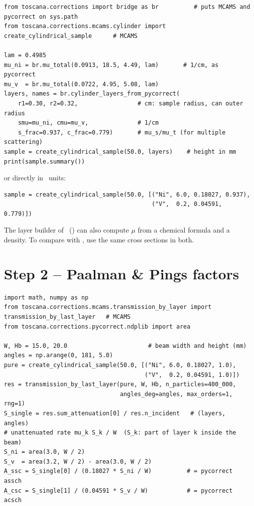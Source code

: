 \documentclass[11pt,a4paper]{report}
\begin{document}
\begin{lstlisting}
from toscana.corrections import bridge as br          # puts MCAMS and pycorrect on sys.path
from toscana.corrections.mcams.cylinder import create_cylindrical_sample      # MCAMS

lam = 0.4985
mu_ni = br.mu_total(0.0913, 18.5, 4.49, lam)       # 1/cm, as pycorrect
mu_v  = br.mu_total(0.0722, 4.95, 5.08, lam)
layers, names = br.cylinder_layers_from_pycorrect(
    r1=0.30, r2=0.32,                 # cm: sample radius, can outer radius
    smu=mu_ni, cmu=mu_v,              # 1/cm
    s_frac=0.937, c_frac=0.779)       # mu_s/mu_t (for multiple scattering)
sample = create_cylindrical_sample(50.0, layers)    # height in mm
print(sample.summary())
\end{lstlisting}
or directly in \mcams\ units:
\begin{lstlisting}
sample = create_cylindrical_sample(50.0, [("Ni", 6.0, 0.18027, 0.937),
                                          ("V",  0.2, 0.04591, 0.779)])
\end{lstlisting}
The layer builder of \mcams\ () can also compute $\mu$
from a chemical formula and a density. To compare with \pyc, use the same cross
sections in both.

\section{Step 2 -- Paalman \& Pings factors}

\begin{lstlisting}
import math, numpy as np
from toscana.corrections.mcams.transmission_by_layer import transmission_by_last_layer   # MCAMS
from toscana.corrections.pycorrect.ndplib import area

W, Hb = 15.0, 20.0                       # beam width and height (mm)
angles = np.arange(0, 181, 5.0)
pure = create_cylindrical_sample(50.0, [("Ni", 6.0, 0.18027, 1.0),
                                        ("V",  0.2, 0.04591, 1.0)])
res = transmission_by_last_layer(pure, W, Hb, n_particles=400_000,
                                 angles_deg=angles, max_orders=1, rng=1)
S_single = res.sum_attenuation[0] / res.n_incident   # (layers, angles)
# unattenuated rate mu_k S_k / W  (S_k: part of layer k inside the beam)
S_ni = area(3.0, W / 2)
S_v  = area(3.2, W / 2) - area(3.0, W / 2)
A_ssc = S_single[0] / (0.18027 * S_ni / W)          # = pycorrect assch
A_csc = S_single[1] / (0.04591 * S_v / W)           # = pycorrect acsch
\end{lstlisting}
\end{document}
